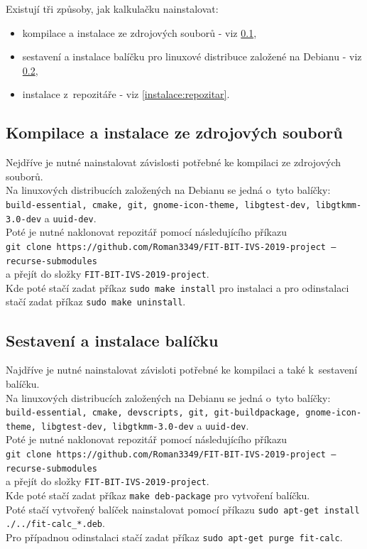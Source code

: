 \documentclass[11pt,a4paper,titlepage]{article}
\begin{document}
	Existují tři způsoby, jak kalkulačku nainstalovat:

	\begin{itemize}
		\item kompilace a instalace ze zdrojových souborů - viz \ref{instalace:manualni},
		\item sestavení a instalace balíčku pro linuxové distribuce založené na Debianu - viz \ref{instalace:balicek},
		\item instalace z~repozitáře - viz \ref{instalace:repozitar}.
	\end{itemize}

	\subsection{Kompilace a instalace ze zdrojových souborů}\label{instalace:manualni}

	Nejdříve je nutné nainstalovat závislosti potřebné ke kompilaci ze zdrojových souborů. \\
	Na linuxových distribucích založených na Debianu se jedná o~tyto balíčky: \texttt{build-essential, cmake, git, gnome-icon-theme, libgtest-dev, libgtkmm-3.0-dev} a \texttt{uuid-dev}. \\

	Poté je nutné naklonovat repozitář pomocí následujícího příkazu \\ \texttt{git clone https://github.com/Roman3349/FIT-BIT-IVS-2019-project --recurse-submodules} \\ a přejít do složky \texttt{FIT-BIT-IVS-2019-project}. \\
	Kde poté stačí zadat příkaz \texttt{sudo make install} pro instalaci a pro odinstalaci stačí zadat příkaz \texttt{sudo make uninstall}.

	\subsection{Sestavení a instalace balíčku}\label{instalace:balicek}

	Najdříve je nutné nainstalovat závisloti potřebné ke kompilaci a také k~sestavení balíčku. \\
	Na linuxových distribucích založených na Debianu se jedná o~tyto balíčky: \texttt{build-essential, cmake, devscripts, git, git-buildpackage, gnome-icon-theme, libgtest-dev, libgtkmm-3.0-dev} a \texttt{uuid-dev}. \\

	Poté je nutné naklonovat repozitář pomocí následujícího příkazu \\ \texttt{git clone https://github.com/Roman3349/FIT-BIT-IVS-2019-project --recurse-submodules} \\ a přejít do složky \texttt{FIT-BIT-IVS-2019-project}. \\
	Kde poté stačí zadat příkaz \texttt{make deb-package} pro vytvoření balíčku. \\
	Poté stačí vytvořený balíček nainstalovat pomocí příkazu \texttt{sudo apt-get install ./../fit-calc\_*.deb}. \\
	Pro případnou odinstalaci stačí zadat příkaz \texttt{sudo apt-get purge fit-calc}.
\end{document}
